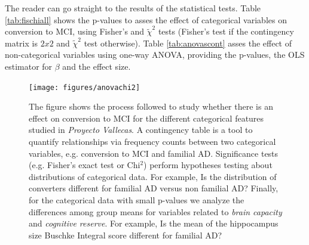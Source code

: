 \documentclass[11pt]{article}
\theoremstyle{definition}
\theoremstyle{remark}
\begin{document}
The reader can go straight to the results of the statistical tests. Table \ref{tab:fischiall} shows the p-values to asses the effect of categorical variables on conversion to MCI, using Fisher's and $\tilde{\chi}^2$ tests (Fisher's test if the contingency matrix is $2x2$  and $\tilde{\chi}^2$ test otherwise). Table \ref{tab:anovascont} asses the effect of non-categorical variables using one-way ANOVA, providing the p-values, the OLS estimator for $\beta$ and the effect size.



\begin{figure}[H]
        \centering
        \texttt{[image: figures/anovachi2]}
        \caption{The figure shows the process followed to study whether there is an effect on conversion to MCI for the different categorical features studied in \emph{Proyecto Vallecas}. A contingency table is a tool to quantify relationships via frequency counts between two categorical variables, e.g. conversion to MCI and familial AD. Significance tests (e.g. Fisher's exact test \cite{fisher1937design}or Chi$^2$) perform hypotheses testing about distributions of categorical data. For example, Is the distribution of converters different for familial AD versus non familial AD? Finally, for the categorical data with small p-values we analyze the differences among group means for variables related to \emph{brain capacity} and \emph{cognitive reserve}. For example, Is the mean of the hippocampus size Buschke Integral score different for familial AD?
        } 
        \label{fig:anovachi}
\end{figure}

\end{document}

